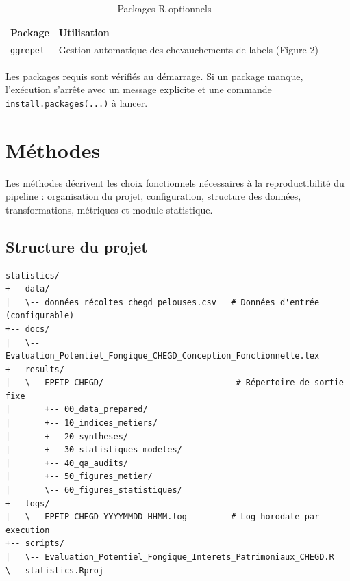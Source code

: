 \documentclass[11pt,a4paper]{article}
\begin{document}
\begin{table}[htbp]
  \centering
  \caption{Packages R optionnels}
  \begin{tabularx}{\textwidth}{lX}
    \toprule
    \textbf{Package} & \textbf{Utilisation} \\
    \midrule
    \texttt{ggrepel} & Gestion automatique des chevauchements de labels (Figure 2) \\
    \bottomrule
  \end{tabularx}
\end{table}

Les packages requis sont vérifiés au démarrage. Si un package manque, l'exécution s'arrête avec un message explicite et une commande \texttt{install.packages(...)} à lancer.

\section{Méthodes}

Les méthodes décrivent les choix fonctionnels nécessaires à la reproductibilité du pipeline :
organisation du projet, configuration, structure des données, transformations, métriques et
module statistique.

\subsection{Structure du projet}

\begin{Verbatim}[fontsize=\small, frame=single, rulecolor=\color{midblue}]
statistics/
+-- data/
|   \-- données_récoltes_chegd_pelouses.csv   # Données d'entrée (configurable)
+-- docs/
|   \-- Evaluation_Potentiel_Fongique_CHEGD_Conception_Fonctionnelle.tex
+-- results/
|   \-- EPFIP_CHEGD/                           # Répertoire de sortie fixe
|       +-- 00_data_prepared/
|       +-- 10_indices_metiers/
|       +-- 20_syntheses/
|       +-- 30_statistiques_modeles/
|       +-- 40_qa_audits/
|       +-- 50_figures_metier/
|       \-- 60_figures_statistiques/
+-- logs/
|   \-- EPFIP_CHEGD_YYYYMMDD_HHMM.log         # Log horodate par execution
+-- scripts/
|   \-- Evaluation_Potentiel_Fongique_Interets_Patrimoniaux_CHEGD.R
\-- statistics.Rproj
\end{Verbatim}
\end{document}
